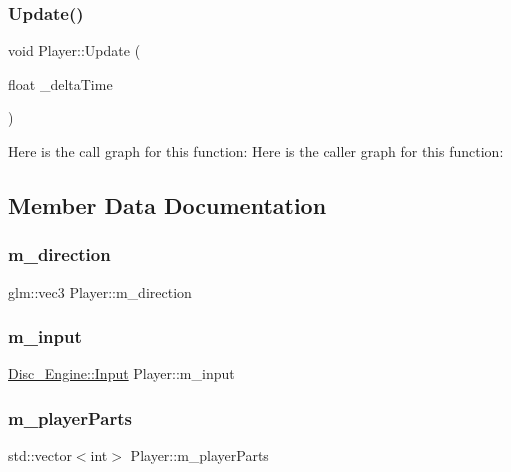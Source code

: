 \subsubsection{\texorpdfstring{Update()}{Update()}}
{\footnotesize\ttfamily void Player\+::\+Update (\begin{DoxyParamCaption}\item[{float}]{\+\_\+delta\+Time }\end{DoxyParamCaption})}

Here is the call graph for this function\+:
Here is the caller graph for this function\+:


\subsection{Member Data Documentation}
\mbox{\label{class_player_aa40fff5ae7b3c916b7e2f8702e18165a}} 
\subsubsection{\texorpdfstring{m\+\_\+direction}{m\_direction}}
{\footnotesize\ttfamily glm\+::vec3 Player\+::m\+\_\+direction\hspace{0.3cm}{\ttfamily [private]}}

\mbox{\label{class_player_a14938c76d5d02878d37cb55188bd153f}} 
\subsubsection{\texorpdfstring{m\+\_\+input}{m\_input}}
{\footnotesize\ttfamily \mbox{\hyperlink{class_disc___engine_1_1_input}{Disc\+\_\+\+Engine\+::\+Input}} Player\+::m\+\_\+input\hspace{0.3cm}{\ttfamily [private]}}

\mbox{\label{class_player_afa409f38614a07bf775127cd5aa23e55}} 
\subsubsection{\texorpdfstring{m\+\_\+player\+Parts}{m\_playerParts}}
{\footnotesize\ttfamily std\+::vector$<$int$>$ Player\+::m\+\_\+player\+Parts\hspace{0.3cm}{\ttfamily [private]}}


